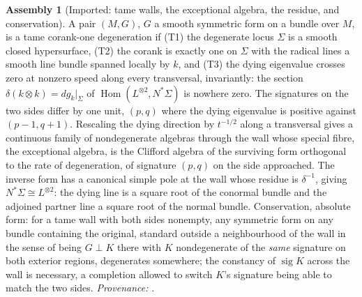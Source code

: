 \documentclass[11pt]{article}
\theoremstyle{definition}
\newtheorem{assembled}[theorem]{Assembly}
\theoremstyle{plain}
\begin{document}
\begin{assembled}[Imported: tame walls, the exceptional algebra, the residue, and conservation]\label{c:odd-extensions.imported-tame-walls-exceptional-algebra-residue}
A pair $(M,G)$, $G$ a smooth symmetric form on a bundle over $M$, is a tame corank-one degeneration if (T1) the degenerate locus $\Sigma$ is a smooth closed hypersurface, (T2) the corank is exactly one on $\Sigma$ with the radical lines a smooth line bundle spanned locally by $k$, and (T3) the dying eigenvalue crosses zero at nonzero speed along every transversal, invariantly: the section $\delta(k \otimes k) = dg_{k}|_{\Sigma}$ of $\operatorname{Hom}(L^{\otimes 2}, N^{*}\Sigma)$ is nowhere zero. The signatures on the two sides differ by one unit, $(p,q)$ where the dying eigenvalue is positive against $(p-1, q+1)$. Rescaling the dying direction by $t^{-1/2}$ along a transversal gives a continuous family of nondegenerate algebras through the wall whose special fibre, the exceptional algebra, is the Clifford algebra of the surviving form orthogonal to the rate of degeneration, of signature $(p,q)$ on the side approached. The inverse form has a canonical simple pole at the wall whose residue is $\delta^{-1}$, giving $N^{*}\Sigma \cong L^{\otimes 2}$: the dying line is a square root of the conormal bundle and the adjoined partner line a square root of the normal bundle. Conservation, absolute form: for a tame wall with both sides nonempty, any symmetric form on any bundle containing the original, standard outside a neighbourhood of the wall in the sense of being $G \perp K$ there with $K$ nondegenerate of the \emph{same} signature on both exterior regions, degenerates somewhere; the constancy of $\operatorname{sig} K$ across the wall is necessary, a completion allowed to switch $K$'s signature being able to match the two sides. \emph{Provenance:} \cite[Hyp.~2.1, Lem.~2.2, Rem.~2.3, Prop.~6.1, Thm.~6.2, Thm.~5.1]{ButlerT4}.
\end{assembled}
\end{document}
